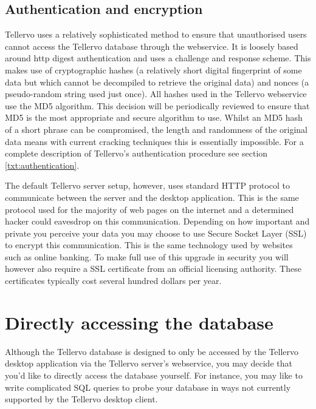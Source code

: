 \subsection{Authentication and encryption}
Tellervo uses a relatively sophisticated method to ensure that unauthorised users cannot access the Tellervo database through the webservice.  It is loosely based around http digest authentication and uses a challenge and response scheme.  This makes use of cryptographic hashes (a relatively short digital fingerprint of some data but which cannot be decompiled to retrieve the original data) and nonces (a pseudo-random string used just once). All hashes used in the Tellervo webservice use the MD5 algorithm. This decision will be periodically reviewed to ensure that MD5 is the most appropriate and secure algorithm to use. Whilst an MD5 hash of a short phrase can be compromised, the length and randomness of the original data means with current cracking techniques this is essentially impossible.   For a complete description of Tellervo's authentication procedure see section \ref{txt:authentication}.

The default Tellervo server setup, however, uses standard HTTP protocol to communicate between the server and the desktop application.  This is the same protocol used for the majority of web pages on the internet and a determined hacker could eavesdrop on this communication.  Depending on how important and private you perceive your data you may choose to use Secure Socket Layer (SSL) to encrypt this communication.  This is the same technology used by websites such as online banking.  To make full use of this upgrade in security you will however also require a SSL certificate from an official licensing authority.  These certificates typically cost several hundred dollars per year. 



\section{Directly accessing the database}
Although the Tellervo database is designed to only be accessed by the Tellervo desktop application via the Tellervo server's webservice, you may decide that you'd like to directly access the database yourself.  For instance, you may like to write complicated SQL queries to probe your database in ways not currently supported by the Tellervo desktop client. 

